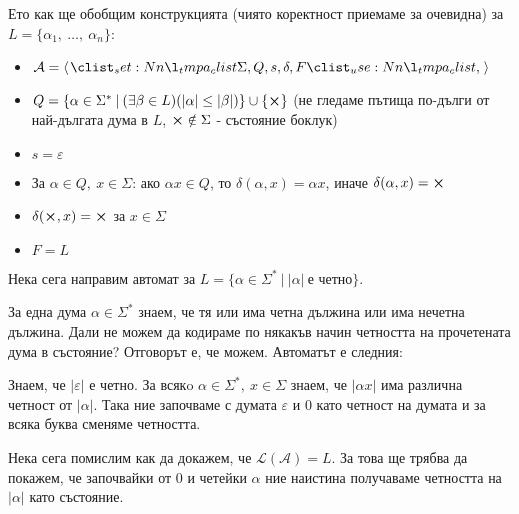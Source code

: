 Ето как ще обобщим конструкцията (чиято коректност приемаме за очевидна) за $L = \{ \alpha_1, \: \dots, \: \alpha_n \}$:
\begin{itemize}
    \item $\mathcal{A} = \opair{\Sigma, Q, s, \delta, F}$
    \item $Q = \{ \alpha \in \Sigma^* \: | \: (\exists \beta \in L) (|\alpha| \leq |\beta|) \} \cup \{ \cross \}$ (не гледаме пътища по-дълги от най-дългата дума в $L$, $\cross \notin \Sigma$ - състояние боклук)
    \item $s = \varepsilon$
    \item За $\alpha \in Q, \: x \in \Sigma$:
          ако $\alpha x \in Q$, то $\delta(\alpha, x) = \alpha x$,
          иначе $\delta(\alpha, x) = \cross$
    \item $\delta(\cross, x) = \cross$ за $x \in \Sigma$
    \item $F = L$
\end{itemize}

Нека сега направим автомат за $L = \{ \alpha \in \Sigma^* \: | \: |\alpha| \: \text{е четно} \}$.

За една дума $\alpha \in \Sigma^*$ знаем, че тя или има четна дължина или има нечетна дължина.
Дали не можем да кодираме по някакъв начин четността на прочетената дума в състояние?
Отговорът е, че можем. Автоматът е следния:

\begin{center}
\end{center}

Знаем, че $|\varepsilon|$ е четно.
За всякo $\alpha \in \Sigma^*, \: x \in \Sigma$ знаем,
че $|\alpha x|$ има различна четност от $|\alpha|$.
Така ние започваме с думата $\varepsilon$ и 0 като четност на думата и за всяка буква сменяме четността.

Нека сега помислим как да докажем, че $\mathcal{L(A)} = L$.
За това ще трябва да покажем, че започвайки от $0$ и четейки $\alpha$ ние наистина получаваме четността на $|\alpha|$ като състояние.

